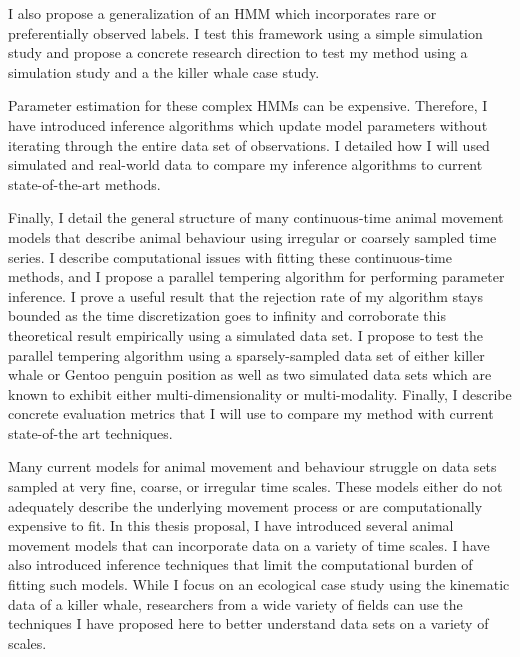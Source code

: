 I also propose a generalization of an HMM which incorporates rare or preferentially observed labels. I test this framework using a simple simulation study and propose a concrete research direction to test my method using a simulation study and a the killer whale case study.

Parameter estimation for these complex HMMs can be expensive. Therefore, I have introduced inference algorithms which update model parameters without iterating through the entire data set of observations. I detailed how I will used simulated and real-world data to compare my inference algorithms to current state-of-the-art methods.

Finally, I detail the general structure of many continuous-time animal movement models that describe animal behaviour using irregular or coarsely sampled time series. I describe computational issues with fitting these continuous-time methods, and I propose a parallel tempering algorithm for performing parameter inference. I prove a useful result that the rejection rate of my algorithm stays bounded as the time discretization goes to infinity and corroborate this theoretical result empirically using a simulated data set. I propose to test the parallel tempering algorithm using a sparsely-sampled data set of either killer whale or Gentoo penguin position as well as two simulated data sets which are known to exhibit either multi-dimensionality or multi-modality. Finally, I describe concrete evaluation metrics that I will use to compare my method with current state-of-the art techniques.

Many current models for animal movement and behaviour struggle on data sets sampled at very fine, coarse, or irregular time scales. These models either do not adequately describe the underlying movement process or are computationally expensive to fit. In this thesis proposal, I have introduced several animal movement models that can incorporate data on a variety of time scales. I have also introduced inference techniques that limit the computational burden of fitting such models. While I focus on an ecological case study using the kinematic data of a killer whale, researchers from a wide variety of fields can use the techniques I have proposed here to better understand data sets on a variety of scales.

\fi